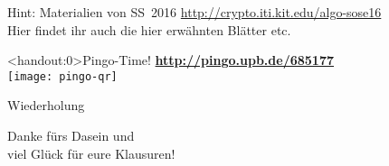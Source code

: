 





	
	
\begin{frame}{Hint: Materialien von SS~2016}
	\centering 
	\Large
	\url{http://crypto.iti.kit.edu/algo-sose16} \\
	\bigskip
	\normalsize Hier findet ihr auch die hier erwähnten Blätter etc.
\end{frame}
	
\begin{frame}<handout:0>{Pingo-Time! \smiley}
	\centering
	\textbf{\large \url{http://pingo.upb.de/685177}} \\
	\texttt{[image: pingo-qr]}
\end{frame}
	
\begin{headframe}
	Wiederholung
\end{headframe}





	
\begin{headframe}
	Danke fürs Dasein und \\
	viel Glück für eure Klausuren! \smiley 
\end{headframe}
	

